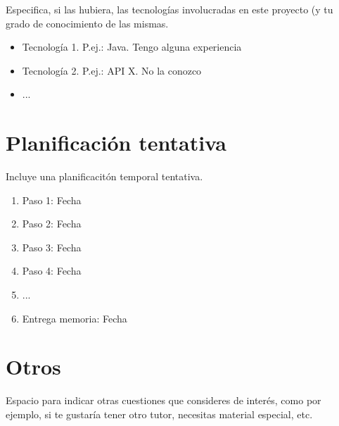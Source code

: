 \documentclass[10pt]{article}
\begin{document}
Especifica, si las hubiera, las tecnologías involucradas en este proyecto (y tu grado de conocimiento de las mismas.

\begin{itemize}
  \item Tecnología 1. P.ej.: Java. Tengo alguna experiencia
  \item Tecnología 2. P.ej.: API X. No la conozco
  \item ...
\end{itemize}


\section{Planificación tentativa}

Incluye una planificacitón temporal tentativa. 

\begin{enumerate}
  \item Paso 1: Fecha
  \item Paso 2: Fecha
  \item Paso 3: Fecha
  \item Paso 4: Fecha
  \item ...
  \item Entrega memoria: Fecha
\end{enumerate}

\section{Otros}

Espacio para indicar otras cuestiones que consideres de interés, como por ejemplo, si te gustaría tener otro tutor, necesitas material especial, etc.
\end{document}
